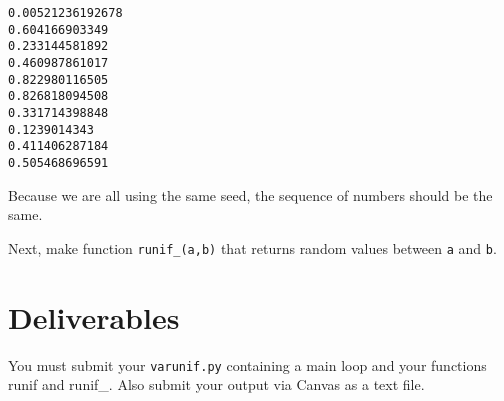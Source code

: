 \begin{fullwidth}
\begin{verbatim}
0.00521236192678
0.604166903349
0.233144581892
0.460987861017
0.822980116505
0.826818094508
0.331714398848
0.1239014343
0.411406287184
0.505468696591
\end{verbatim}

Because we are all using the same seed, the sequence of numbers should be the same.

Next, make function {\tt runif\_(a,b)} that returns random values between {\tt a} and {\tt b}.

\section{Deliverables}

You must submit your {\tt varunif.py} containing a main loop and your functions runif and runif\_. Also submit your output via Canvas as a text file.

\end{fullwidth}
